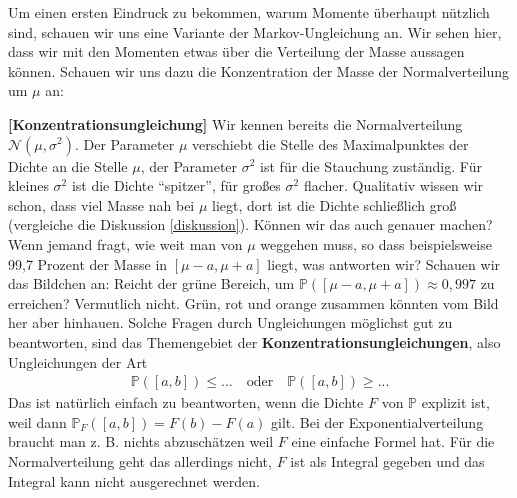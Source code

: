 Um einen ersten Eindruck zu bekommen, warum Momente \"uberhaupt n\"utzlich sind, schauen wir uns eine Variante der Markov-Ungleichung an. Wir sehen hier, dass wir mit den Momenten etwas \"uber die Verteilung der Masse aussagen k\"onnen. Schauen wir uns dazu die Konzentration der Masse der Normalverteilung um $\mu$ an:
\begin{beispiel}\label{NV}
 \textbf{[Konzentrationsungleichung]}
	Wir kennen bereits die Normalverteilung $\mathcal N(\mu,\sigma^2)$. Der Parameter $\mu$ verschiebt die Stelle des Maximalpunktes der Dichte an die Stelle $\mu$, der Parameter $\sigma^2$ ist f\"ur die Stauchung zust\"andig. F\"ur kleines $\sigma^2$ ist die Dichte \enquote{spitzer}, f\"ur gro\ss es $\sigma^2$ flacher. Qualitativ wissen wir schon, dass viel Masse nah bei $\mu$ liegt, dort ist die Dichte schlie\ss lich gro\ss{} (vergleiche die Diskussion \ref{diskussion}). K\"onnen wir das auch genauer machen? Wenn jemand fragt, wie weit man von $\mu$ weggehen muss, so dass beispielsweise 99,7 Prozent der Masse in $[\mu-a,\mu+a]$ liegt, was antworten wir? Schauen wir das Bildchen an: Reicht der gr\"une Bereich, um $\mathbb P([\mu-a,\mu+a])\approx 0,997$ zu erreichen? Vermutlich nicht. Gr\"un, rot und orange zusammen k\"onnten vom Bild her aber hinhauen. Solche Fragen durch Ungleichungen m\"oglichst gut zu beantworten, sind das Themengebiet der \textbf{Konzentrationsungleichungen}, also Ungleichungen der Art
	\begin{align*}
		\mathbb P([a,b])\leq ...\quad \text{oder}\quad
				\mathbb P([a,b])\geq ...
	\end{align*}
	Das ist nat\"urlich einfach zu beantworten, wenn die Dichte $F$ von $\mathbb P${} explizit ist, weil dann $\mathbb P_F([a,b])=F(b)-F(a)$ gilt. Bei der Exponentialverteilung braucht man z. B. nichts abzusch\"atzen weil $F$ eine einfache Formel hat. F\"ur die Normalverteilung geht das allerdings nicht, $F$ ist als Integral gegeben und das Integral kann nicht ausgerechnet werden.
	\begin{center}
\end{center}
\end{beispiel}
